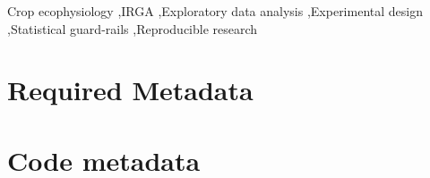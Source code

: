 \documentclass[a4paper,fleqn]{cas-dc}
\begin{document}

\begin{abstract}
\emph{PhysioFlow} is an open-source Python/Streamlit platform for crop-ecophysiology and general agronomic or biological data. It ingests CSV/TSV/XLSX exports, validates them against an explicit schema, and offers a configurable replicate pipeline, exploratory analysis with statistical guard-rails (confounding, multicollinearity, normality and multi-method outlier checks), supervised regression and classification with optional GroupKFold, geospatial analysis in UTM metres, STL decomposition, and a formal experimental-design module (from completely randomised and block designs to factorial, Latin square, split-plot, strip-plot, nested, ANCOVA and dose-response) cross-validated against R. An automatic data-profile makes it dataset-agnostic beyond ecophysiology. Released under GPL-2.0, it runs code-free in a trilingual (PT/EN/ES) interface.
\end{abstract}

\begin{keywords}
Crop ecophysiology \sep IRGA \sep Exploratory data analysis \sep Experimental design \sep Statistical guard-rails \sep Reproducible research
\end{keywords}

\maketitle

\section*{Required Metadata}

\section*{Code metadata}
\end{document}
